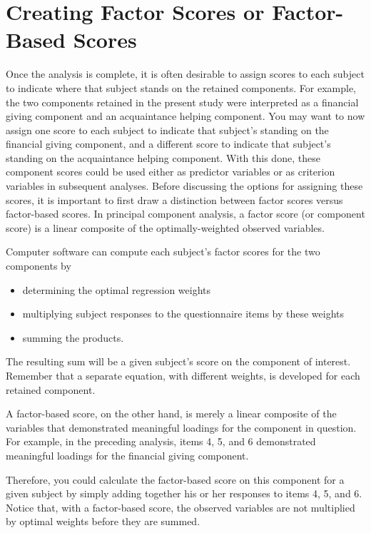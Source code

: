\documentclass[a4paper,12pt]{article}
\begin{document}

\section*{Creating Factor Scores or Factor-Based Scores}

Once the analysis is complete, it is often desirable to assign scores to each subject to indicate
where that subject stands on the retained components. For example, the two components
retained in the present study were interpreted as a financial giving component and an
acquaintance helping component. You may want to now assign one score to each subject to
indicate that subject’s standing on the financial giving component, and a different score to
indicate that subject’s standing on the acquaintance helping component. With this done, these
component scores could be used either as predictor variables or as criterion variables in
subsequent analyses.
Before discussing the options for assigning these scores, it is important to first draw a distinction
between factor scores versus factor-based scores. In principal component analysis, a factor
score (or component score) is a linear composite of the optimally-weighted observed variables.

Computer software can compute each subject’s factor scores for the two components
by

\begin{itemize}
	\item determining the optimal regression weights
	\item multiplying subject responses to the questionnaire items by these weights
	\item summing the products.
\end{itemize}

The resulting sum will be a given subject’s score on the component of interest. Remember that a
separate equation, with different weights, is developed for each retained component.

A factor-based score, on the other hand, is merely a linear composite of the variables that
demonstrated meaningful loadings for the component in question. For example, in the preceding
analysis, items 4, 5, and 6 demonstrated meaningful loadings for the financial giving component.

Therefore, you could calculate the factor-based score on this component for a given subject by
simply adding together his or her responses to items 4, 5, and 6. Notice that, with a factor-based
score, the observed variables are not multiplied by optimal weights before they are summed.
\end{document}
